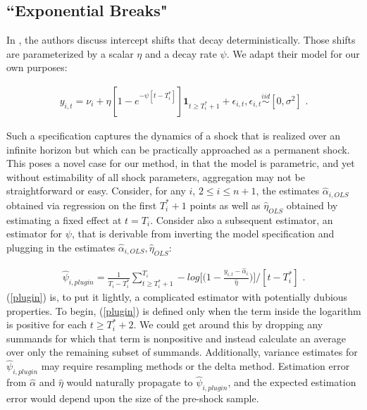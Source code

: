 \documentclass{uiucthesis2021}
\newcommand{\simiid}{\stackrel{iid}{\sim}} %
\theoremstyle{definition}
\begin{document}
  \subsection{``Exponential Breaks"}
  In \cite[][]{castle2011forecasting}, the authors discuss intercept shifts that decay deterministically.  Those shifts are parameterized by a scalar $\eta$ and a decay rate $\psi$.  We adapt their model for our own purposes:
  
  \begin{align}
  y_{i,t} = \nu_{i} + \eta[1 - e^{-\psi[t-T_{i}^{*}]}]\textbf{1}_{t\geq T_{i}^{*}+1} + \epsilon_{i,t}, \epsilon_{i,t} \simiid [0,\sigma^{2}] \text{ .}\label{decay_model}
  \end{align}
  
  Such a specification captures the dynamics of a shock that is realized over an infinite horizon but which can be practically approached as a permanent shock.  This poses a novel case for our method, in that the model is parametric, and yet without estimability of all shock parameters, aggregation may not be straightforward or easy.  Consider, for any $i$, $2 \leq i \leq n+1$, the estimates $\hat\alpha_{i,OLS}$  obtained via regression on the first $T_{i}^{*}+1$ points as well as $\hat\eta_{OLS}$ obtained by estimating a fixed effect at $t=T_{i}$.  Consider also a subsequent estimator, an estimator for $\psi$, that is derivable from inverting the model specification and plugging in the estimates  $\hat\alpha_{i,OLS},\hat\eta_{OLS}$:
  
  \begin{align}
  \hat\psi_{i,plugin} = \frac{1}{T_{i}-T_{i}^{*}}\sum^{T_{i}}_{t\geq T_{i}^{*}+1}-log{\big[\big(1-\frac{y_{i,t}-\hat\alpha_{i}}{\hat\eta}\big)\big]} / [t-T_{i}^{*}]\text{ .}\label{plugin}
  \end{align}
  (\ref{plugin}) is, to put it lightly, a complicated estimator with potentially dubious properties.  To begin, (\ref{plugin}) is defined only when the term inside the logarithm is positive for each $t\geq T^{*}_{i}+2$.  We could get around this by dropping any summands for which that term is nonpositive and instead calculate an average over only the remaining subset of summands.  Additionally, variance estimates for $\hat\psi_{i,plugin}$ may require resampling methods or the delta method.  Estimation error from $\hat\alpha$ and $\hat\eta$ would naturally propagate to $\hat\psi_{i,plugin}$, and the expected estimation error would depend upon the size of the pre-shock sample.
  
\end{document}
